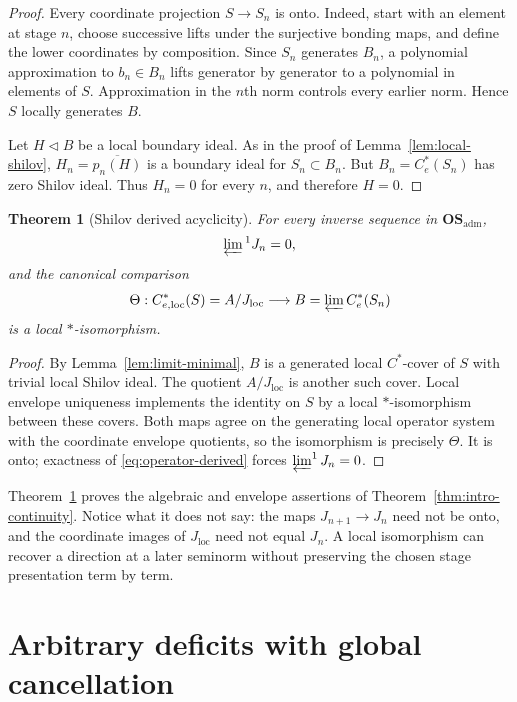 \documentclass[11pt,a4paper]{amsart}
\theoremstyle{plain}
\newtheorem{theorem}{Theorem}[section]
\theoremstyle{definition}
\newcommand{\Ce}{C_e^*}
\newcommand{\Celoc}{C_{e,\mathrm{loc}}^*}
\newcommand{\OSadm}{\mathbf{OS}_{\mathrm{adm}}}
\begin{document}
\begin{proof}
Every coordinate projection $S\to S_n$ is onto.  Indeed, start with an element at stage $n$,
choose successive lifts under the surjective bonding maps, and define the lower coordinates by
composition.  Since $S_n$ generates $B_n$, a polynomial approximation to $b_n\in B_n$ lifts
generator by generator to a polynomial in elements of $S$.  Approximation in the $n$th norm
controls every earlier norm.  Hence $S$ locally generates $B$.

Let $H\triangleleft B$ be a local boundary ideal.  As in the proof of
Lemma~\ref{lem:local-shilov}, $H_n=\overline{p_n(H)}$ is a boundary ideal for
$S_n\subset B_n$.  But $B_n=\Ce(S_n)$ has zero Shilov ideal.  Thus $H_n=0$ for every $n$, and
therefore $H=0$.
\end{proof}

\begin{theorem}[Shilov derived acyclicity]\label{thm:shilov-acyclicity}
For every inverse sequence in $\OSadm$,
\[
 \varprojlim{}^1J_n=0,
\]
and the canonical comparison
\[
 \Theta:\Celoc(S)=A/J_{\mathrm{loc}}\longrightarrow B=\varprojlim\Ce(S_n)
\]
is a local $*$-isomorphism.
\end{theorem}

\begin{proof}
By Lemma~\ref{lem:limit-minimal}, $B$ is a generated local $C^*$-cover of $S$ with trivial local
Shilov ideal.  The quotient $A/J_{\mathrm{loc}}$ is another such cover.  Local envelope uniqueness
\cite[Theorem~3.18]{Joita2025} implements the identity on $S$ by a local $*$-isomorphism between
these covers.  Both maps agree on the generating local operator system with the coordinate
envelope quotients, so the isomorphism is precisely $\Theta$.  It is onto; exactness of
\eqref{eq:operator-derived} forces $\varprojlim^1J_n=0$.
\end{proof}

Theorem~\ref{thm:shilov-acyclicity} proves the algebraic and envelope assertions of
Theorem~\ref{thm:intro-continuity}.  Notice what it does not say: the maps
$J_{n+1}\to J_n$ need not be onto, and the coordinate images of $J_{\mathrm{loc}}$ need not equal
$J_n$.  A local isomorphism can recover a direction at a later seminorm without preserving the
chosen stage presentation term by term.

\section{Arbitrary deficits with global cancellation}\label{sec:prescribed}
\end{document}

